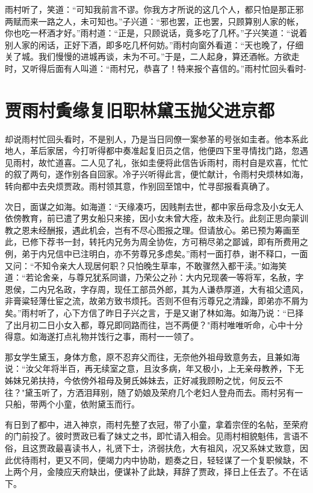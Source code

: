 雨村听了，笑道：“可知我前言不谬。你我方才所说的这几个人，都只怕是那正邪两赋而来一路之人，未可知也。”子兴道：“邪也罢，正也罢，只顾算别人家的帐，你也吃一杯酒才好。”雨村道：“正是，只顾说话，竟多吃了几杯。”子兴笑道：“说着别人家的闲话，正好下酒，即多吃几杯何妨。”雨村向窗外看道：“天也晚了，仔细关了城。我们慢慢的进城再谈，未为不可。”于是，二人起身，算还酒帐。方欲走时，又听得后面有人叫道：“雨村兄，恭喜了！特来报个喜信的。”雨村忙回头看时-

\chapter{贾雨村夤缘复旧职\ttlbreak 林黛玉抛父进京都}

却说雨村忙回头看时，不是别人，乃是当日同僚一案参革的号张如圭者。他本系此地人，革后家居，今打听得都中奏准起复旧员之信，他便四下里寻情找门路，忽遇见雨村，故忙道喜。二人见了礼，张如圭便将此信告诉雨村，雨村自是欢喜，忙忙的叙了两句，遂作别各自回家。冷子兴听得此言，便忙献计，令雨村央烦林如海，转向都中去央烦贾政。雨村领其意，作别回至馆中，忙寻邸报看真确了。

次日，面谋之如海。如海道：“天缘凑巧，因贱荆去世，都中家岳母念及小女无人依傍教育，前已遣了男女船只来接，因小女未曾大痊，故未及行。此刻正思向蒙训教之恩未经酬报，遇此机会，岂有不尽心图报之理。但请放心。弟已预为筹画至此，已修下荐书一封，转托内兄务为周全协佐，方可稍尽弟之鄙诚，即有所费用之例，弟于内兄信中已注明白，亦不劳尊兄多虑矣。”雨村一面打恭，谢不释口，一面又问：“不知令亲大人现居何职？只怕晚生草率，不敢骤然入都干渎。”如海笑道：“若论舍亲，与尊兄犹系同谱，乃荣公之孙：大内兄现袭一等将军，名赦，字恩侯，二内兄名政，字存周，现任工部员外郎，其为人谦恭厚道，大有祖父遗风，非膏粱轻薄仕宦之流，故弟方致书烦托。否则不但有污尊兄之清躁，即弟亦不屑为矣。”雨村听了，心下方信了昨日子兴之言，于是又谢了林如海。如海乃说：“已择了出月初二日小女入都，尊兄即同路而往，岂不两便？"雨村唯唯听命，心中十分得意。如海遂打点礼物并饯行之事，雨村一一领了。

那女学生黛玉，身体方愈，原不忍弃父而往，无奈他外祖母致意务去，且兼如海说：“汝父年将半百，再无续室之意，且汝多病，年又极小，上无亲母教养，下无姊妹兄弟扶持，今依傍外祖母及舅氏姊妹去，正好减我顾盼之忧，何反云不往？"黛玉听了，方洒泪拜别，随了奶娘及荣府几个老妇人登舟而去。雨村另有一只船，带两个小童，依附黛玉而行。

有日到了都中，进入神京，雨村先整了衣冠，带了小童，拿着宗侄的名帖，至荣府的门前投了。彼时贾政已看了妹丈之书，即忙请入相会。见雨村相貌魁伟，言语不俗，且这贾政最喜读书人，礼贤下士，济弱扶危，大有祖风，况又系妹丈致意，因此优待雨村，更又不同，便竭力内中协助，题奏之日，轻轻谋了一个复职候缺，不上两个月，金陵应天府缺出，便谋补了此缺，拜辞了贾政，择日上任去了。不在话下。

